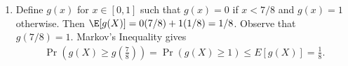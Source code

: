 \begin{enumerate}
    \item
    Define $g(x)$ for $x \in [0,1]$ such that
    $g(x)=0$ if $x<7/8$ and $g(x)=1$ otherwise.
    Then $\E[g(X)] = 0 (7/8) + 1 (1/8) = 1/8$.
    Observe that $g(7/8) = 1$.
    Markov's Inequality gives
    \begin{align}
        \Pr(g(X) \geq g(\frac{7}{8})) =
        \Pr(g(X) \geq 1) \leq E[g(X)] = \frac{1}{8}.
        \nonumber
    \end{align}

\end{enumerate}

